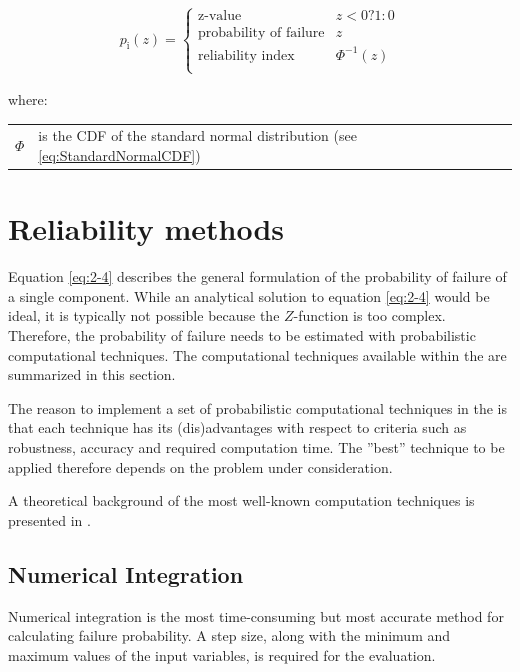 \begin{align} 
	\label{eq:SampleAddition}
	p_{\text{i}}\left(z\right) = \left\{\begin{array}{ll}\text{z-value} & z < 0 ? 1 : 0\\
		\text{probability of failure} & z \\
		\text{reliability index} & \Phi^{-1}\left(z\right) \\
	\end{array}	
	\right.
\end{align}

where:
\begin{longtable}{p{16mm}p{\textwidth-24pt-16mm}}  
	$\Phi$ & is the CDF of the standard normal distribution (see \autoref{eq:StandardNormalCDF}) \\
\end{longtable}

\section{Reliability methods}
\label{sec:ReliabilityMethods}

Equation \eqref{eq:2-4} describes the general formulation of the probability of failure of a single component. While an analytical solution to equation \eqref{eq:2-4} would be ideal, it is typically not possible because the $Z$-function is too complex. Therefore, the probability of failure needs to be estimated with probabilistic computational techniques. The computational techniques available within the \probLib are summarized in this section. 

The reason to implement a set of probabilistic computational techniques in the \probLib is that each technique has its (dis)advantages with respect to criteria such as robustness, accuracy and required computation time. The ''best'' technique to be applied therefore depends on the problem under consideration.

A theoretical background of the most well-known computation techniques is presented in .

\subsection{Numerical Integration}
\label{sec:NumericalIntegration}

Numerical integration is the most time-consuming but most accurate method for calculating failure probability. A step size, along with the minimum and maximum values of the input variables, is required for the evaluation.

